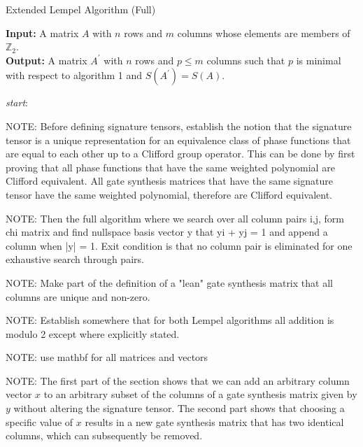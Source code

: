 \documentclass{article}
\theoremstyle{definition}
\theoremstyle{problem}
\theoremstyle{lemma}
\begin{document}
		\begin{algorithm}
			\caption{Extended Lempel Algorithm (Full)}
			\textbf{Input:} A matrix $A$ with $n$ rows and $m$ columns whose elements are members of $\mathbb{Z}_2$.\\
			\textbf{Output:} A matrix $A^\prime$ with $n$ rows and $p \leq m$ columns such that $p$ is minimal with respect to algorithm 1 and $S(A^\prime) = S(A)$.
			\begin{algorithmic}[1]
				\BState \emph{start}:
				\Else
				\EndIf
				\EndProcedure
			\end{algorithmic}
		\end{algorithm}
			
				NOTE: Before defining signature tensors, establish the notion that the signature tensor is a unique representation for an equivalence class of phase functions that are equal to each other up to a Clifford group operator. This can be done by first proving that all phase functions that have the same weighted polynomial are Clifford equivalent. All gate synthesis matrices that have the same signature tensor have the same weighted polynomial, therefore are Clifford equivalent.
			
				
				NOTE: Then the full algorithm where we search over all column pairs i,j, form chi matrix and find nullspace basis vector y that yi + yj = 1 and append a column when |y| = 1. Exit condition is that no column pair is eliminated for one exhaustive search through pairs.
				
				NOTE: Make part of the definition of a "lean" gate synthesis matrix that all columns are unique and non-zero.
				
				NOTE: Establish somewhere that for both Lempel algorithms all addition is modulo 2 except where explicitly stated.
				
				NOTE: use mathbf for all matrices and vectors
				
				NOTE: The first part of the section shows that we can add an arbitrary column vector $x$ to an arbitrary subset of the columns of a gate synthesis matrix given by $y$ without altering the signature tensor. The second part shows that choosing a specific value of $x$ results in a new gate synthesis matrix that has two identical columns, which can subsequently be removed.
				
\end{document}
